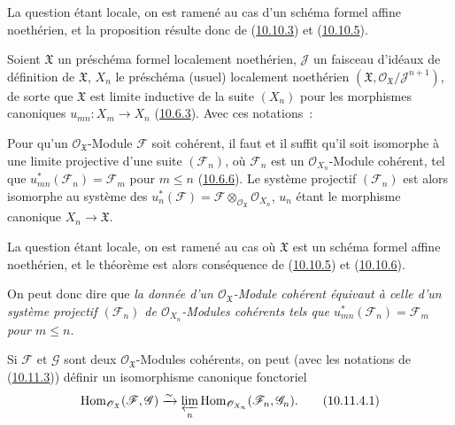 La question étant locale, on est ramené au cas d'un schéma formel affine
noethérien, et la proposition résulte donc de
(\hyperref[I.10.10.3-fr]{10.10.3}) et
(\hyperref[I.10.10.5-fr]{10.10.5}).

\begin{env}[10.11.2]
\label{I.10.11.2-fr}
Soient $\mathfrak{X}$ un préschéma formel localement noethérien,
$\mathscr{J}$ un faisceau d'idéaux de définition de $\mathfrak{X}$,
$X_n$ le préschéma (usuel) localement noethérien
$(\mathfrak{X},\mathscr{O}_{\mathfrak{X}}/\mathscr{J}^{n+1})$, de
sorte que $\mathfrak{X}$ est limite inductive de la suite $(X_n)$ pour
les morphismes canoniques $u_{mn}:X_m\to X_n$
(\hyperref[I.10.6.3-fr]{10.6.3}). Avec ces notations~:
\end{env}

\begin{theorem}[10.11.3]
\label{I.10.11.3-fr}
Pour qu'un $\mathscr{O}_{\mathfrak{X}}$-Module $\mathscr{F}$ soit
cohérent, il faut et il suffit qu'il soit isomorphe à une limite
projective d'une suite $(\mathscr{F}_n)$, où $\mathscr{F}_n$ est un
$\mathscr{O}_{X_n}$-Module cohérent, tel que
$u_{mn}^*(\mathscr{F}_n)=\mathscr{F}_m$ pour $m\leq n$
(\hyperref[I.10.6.6-fr]{10.6.6}). Le système projectif
$(\mathscr{F}_n)$ est alors isomorphe au système des
$u_n^*(\mathscr{F})=\mathscr{F}
\otimes_{\mathscr{O}_{\mathfrak{X}}}\mathscr{O}_{X_n}$, $u_n$ étant
le morphisme canonique $X_n\to\mathfrak{X}$.
\end{theorem}

La question étant locale, on est ramené au cas où $\mathfrak{X}$ est
un schéma formel affine noethérien, et le théorème est alors conséquence
de (\hyperref[I.10.10.5-fr]{10.10.5}) et
(\hyperref[I.10.10.6-fr]{10.10.6}).

On peut donc dire que \emph{la donnée d'un
$\mathscr{O}_{\mathfrak{X}}$-Module cohérent équivaut à celle d'un
système projectif $(\mathscr{F}_n)$ de
$\mathscr{O}_{X_n}$-Modules cohérents tels que
$u_{mn}^*(\mathscr{F}_n)=\mathscr{F}_m$ pour $m\leq n$}.

\begin{corollary}[10.11.4]
\label{I.10.11.4-fr}
Si $\mathscr{F}$ et $\mathscr{G}$ sont deux
$\mathscr{O}_{\mathfrak{X}}$-Modules cohérents, on peut (avec les
notations de (\hyperref[I.10.11.3-fr]{10.11.3})) définir un
isomorphisme canonique fonctoriel
\[
  \label{I.10.11.4.1-fr}
  \operatorname{Hom}_{\mathscr{O}_{\mathfrak{X}}}
  (\mathscr{F},\mathscr{G})
  \xrightarrow{\sim}
  \varprojlim_n
  \operatorname{Hom}_{\mathscr{O}_{X_n}}
  (\mathscr{F}_n,\mathscr{G}_n).
  \tag{10.11.4.1}
\]
\end{corollary}

